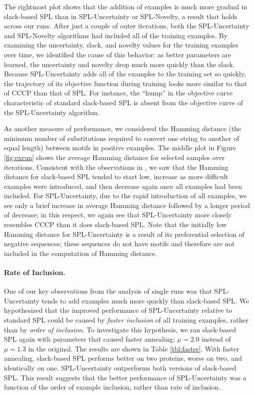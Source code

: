 \documentclass{article}
\newcommand{\myparagraph}[1]{\vspace{-2mm}\paragraph{#1}}
\begin{document}
The rightmost plot shows that the addition of examples is much more gradual in slack-based SPL than in SPL-Uncertainty or SPL-Novelty, a result that holds across our runs. After just a couple of outer iterations, both the SPL-Uncertainty and SPL-Novelty algorithms had included all of the training examples. By examining the uncertainty, slack, and novelty values for the training examples over time, we identified the cause of this behavior: as better parameters are learned, the uncertainty and novelty drop much more quickly than the slack. Because SPL-Uncertainty adds all of the examples to the training set so quickly, the trajectory of its objective function during training looks more similar to that of CCCP than that of SPL. For instance, the ``hump'' in the objective curve characteristic of standard slack-based SPL is absent from the objective curve of the SPL-Uncertainty algorithm.

As another measure of performance, we considered the Hamming distance (the minimum number of substitutions required to convert one string to another of equal length) between motifs in positive examples. The middle plot in Figure \ref{fig:exrun} shows the average Hamming distance for selected samples over iterations. Consistent with the observations in \cite{SPL}, we saw that the Hamming distance for slack-based SPL tended to start low, increase as more difficult examples were introduced, and then decrease again once all examples had been included. For SPL-Uncertainty, due to the rapid introduction of all examples, we see only a brief increase in average Hamming distance followed by a longer period of decrease; in this respect, we again see that SPL-Uncertainty more closely resembles CCCP than it does slack-based SPL.  Note that the initially low Hamming distance for SPL-Uncertainty is a result of its preferential selection of negative sequences; these sequences do not have motifs and therefore are not included in the computation of Hamming distance.

\myparagraph{Rate of Inclusion.} One of our key observations from the analysis of single runs was that SPL-Uncertainty tends to add examples much more quickly than slack-based SPL. We hypothesized that the improved performance of SPL-Uncertainty relative to standard SPL could be caused by  \emph{faster inclusion} of all training examples, rather than by \emph{order of inclusion}.  To investigate this hypothesis, we ran slack-based SPL again with parameters that caused faster annealing: $\mu=2.0$ instead of $\mu=1.3$ in the original.  The results are shown in Table \ref{tbl:faster}.  With faster annealing, slack-based SPL performs better on two proteins, worse on two, and identically on one. SPL-Uncertainty outperforms both versions of slack-based SPL.  This result suggests that the better performance of SPL-Uncertainty was a function of the order of example inclusion, rather than rate of inclusion.
\end{document}
